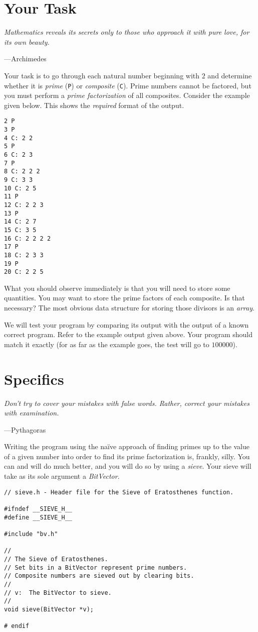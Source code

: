 \documentclass{article}
\begin{document}
\section{Your Task}
\epigraph{\emph{Mathematics reveals its secrets only to those who approach it
with pure love, for its own beauty.}}{---Archimedes}

Your task is to go through each natural number beginning with $2$ and determine whether it is \emph{prime} (\texttt{P}) or \emph{composite} (\texttt{C}).
Prime numbers cannot be factored, but you must perform a \emph{prime factorization} of all composites. Consider the example given below. This shows the \emph{required} format of the output.

\begin{lstlisting}[title=Example]
2 P
3 P
4 C: 2 2
5 P
6 C: 2 3
7 P
8 C: 2 2 2
9 C: 3 3
10 C: 2 5
11 P
12 C: 2 2 3
13 P
14 C: 2 7
15 C: 3 5
16 C: 2 2 2 2
17 P
18 C: 2 3 3
19 P
20 C: 2 2 5
\end{lstlisting}

What you should observe immediately is that you will need to store
some quantities. You may want to store the prime factors of each
composite. Is that necessary? The most obvious data structure for storing those divisors is an \emph{array}.

We will test your program by comparing its output with the output of a known correct program. Refer to the example output given above. Your program should match it exactly (for as far as the example goes, the test will go to $100000$).

\section{Specifics}
\epigraph{\emph{Don't try to cover your mistakes with false words. Rather,
correct your mistakes with examination.}}{---Pythagoras}

Writing the program using the na\"ive approach of finding primes
up to the value of a given number into order to find its prime
factorization is, frankly, silly. You can and will do much better,
and you will do so by using a \emph{sieve}. Your sieve will take as its sole argument a \emph{BitVector}.

\begin{lstlisting}[title=sieve.h]
// sieve.h - Header file for the Sieve of Eratosthenes function.

#ifndef __SIEVE_H__
#define __SIEVE_H__

#include "bv.h"

//
// The Sieve of Eratosthenes.
// Set bits in a BitVector represent prime numbers.
// Composite numbers are sieved out by clearing bits.
//
// v:  The BitVector to sieve.
//
void sieve(BitVector *v);

# endif
\end{lstlisting}
\end{document}
